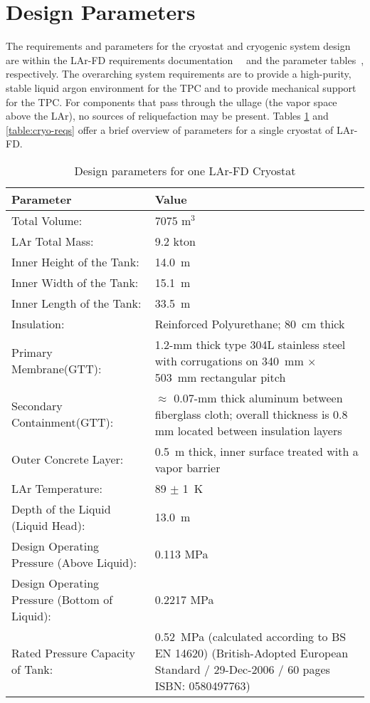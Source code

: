 \section{Design Parameters}

The requirements and parameters for the cryostat and cryogenic system design are within the LAr-FD requirements documentation~\cite{lar-fd-req}~\cite{lar-fd-req-traceback}  and the parameter tables~\cite{lar-fd-params}, respectively. The overarching system requirements are to provide a high-purity, stable liquid argon environment for the TPC and to provide mechanical support for the TPC. 
For components that pass through the ullage (the vapor space above the LAr), no sources of reliquefaction may be present. Tables \ref{table:param-summ-LAr-FD} and 
\ref{table:cryo-reqs} offer a brief overview of parameters for a single cryostat of LAr-FD.

\begin{table}
\caption{Design parameters for one LAr-FD Cryostat}
\label{table:param-summ-LAr-FD}
 \begin{tabular}[htbp]{|l| p{8cm} |}
\hline 
\textbf{Parameter} &  \textbf{Value} \\
\hline
Total Volume: &  7075 m$^3$ \\
\hline
LAr Total Mass: & 9.2 kton \\
\hline
Inner Height of the Tank: & 14.0~m \\
\hline
Inner Width of the Tank: & 15.1~m \\
\hline
Inner Length of the Tank: & 33.5~m  \\
\hline
Insulation:&  Reinforced Polyurethane; 80~cm thick \\
\hline
Primary Membrane(GTT): & 1.2-mm thick type 304L stainless steel with corrugations on 340~mm $\times$ 503~mm rectangular pitch\\
\hline
Secondary Containment(GTT): &  $\approx$ 0.07-mm thick aluminum between fiberglass cloth; overall thickness is 0.8 mm located between insulation layers \\
\hline
Outer Concrete Layer: & 0.5~m thick, inner surface treated with a vapor barrier \\
\hline
LAr Temperature: & 89 $\pm$ 1~K \\
\hline
Depth of the Liquid (Liquid Head): & 13.0~m \\
\hline
Design Operating Pressure (Above Liquid):&  0.113 MPa \\
\hline
Design Operating Pressure (Bottom of Liquid):&  0.2217 MPa \\
\hline
Rated Pressure Capacity of Tank:& 0.52~MPa (calculated according to BS EN 14620)
(British-Adopted European Standard / 29-Dec-2006 / 60 pages ISBN: 0580497763) \\
\hline
\end{tabular} 
\end{table}

